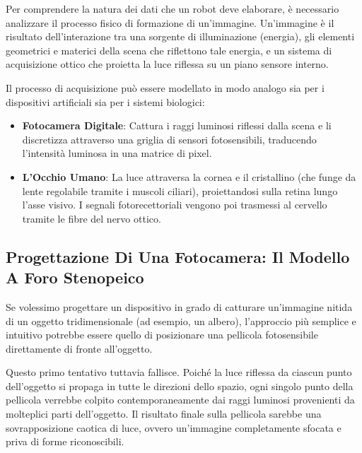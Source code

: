 ﻿\documentclass[11pt, a4paper]{article}
\begin{document}
Per comprendere la natura dei dati che un robot deve elaborare, è necessario analizzare il processo fisico di formazione di un'immagine. Un'immagine è il risultato dell'interazione tra una sorgente di illuminazione (energia), gli elementi geometrici e materici della scena che riflettono tale energia, e un sistema di acquisizione ottico che proietta la luce riflessa su un piano sensore interno.


Il processo di acquisizione può essere modellato in modo analogo sia per i dispositivi artificiali sia per i sistemi biologici:
\begin{itemize}[noitemsep]
    \item \textbf{Fotocamera Digitale}: Cattura i raggi luminosi riflessi dalla scena e li discretizza attraverso una griglia di sensori fotosensibili, traducendo l'intensità luminosa in una matrice di pixel.
    \item \textbf{L'Occhio Umano}: La luce attraversa la cornea e il cristallino (che funge da lente regolabile tramite i muscoli ciliari), proiettandosi sulla retina lungo l'asse visivo. I segnali fotorecettoriali vengono poi trasmessi al cervello tramite le fibre del nervo ottico.
\end{itemize}



\subsection{Progettazione Di Una Fotocamera: Il Modello A Foro Stenopeico}

Se volessimo progettare un dispositivo in grado di catturare un'immagine nitida di un oggetto tridimensionale (ad esempio, un albero), l'approccio più semplice e intuitivo potrebbe essere quello di posizionare una pellicola fotosensibile direttamente di fronte all'oggetto.


Questo primo tentativo tuttavia fallisce. Poiché la luce riflessa da ciascun punto dell'oggetto si propaga in tutte le direzioni dello spazio, ogni singolo punto della pellicola verrebbe colpito contemporaneamente dai raggi luminosi provenienti da molteplici parti dell'oggetto. Il risultato finale sulla pellicola sarebbe una sovrapposizione caotica di luce, ovvero un'immagine completamente sfocata e priva di forme riconoscibili.
\end{document}

